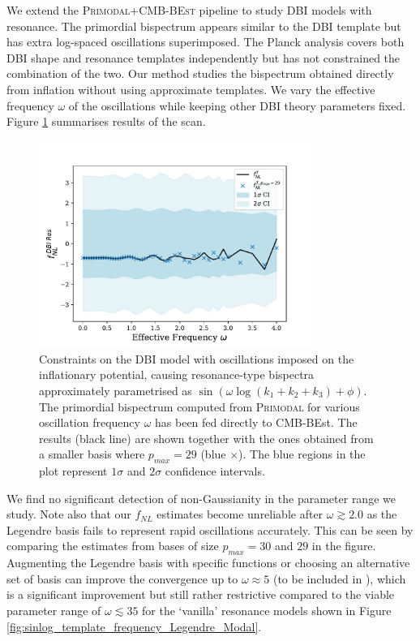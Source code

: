 \bigskip

We extend the \textsc{Primodal}+\textsc{CMB-BEst} pipeline to study DBI models with resonance. The primordial bispectrum appears similar to the DBI template but has extra log-spaced oscillations superimposed. The Planck analysis covers both DBI shape and resonance templates independently but has not constrained the combination of the two. Our method studies the bispectrum obtained directly from inflation without using approximate templates. We vary the effective frequency $\omega$ of the oscillations while keeping other DBI theory parameters fixed. Figure \ref{fig:dbi_resonance_scan} summarises results of the scan.

\begin{figure}[htbp!] 
	\centering    
	\includegraphics[width=0.8\textwidth]{dbi_reso_scan_fNLs_new.pdf}
	\caption{Constraints on the DBI model with oscillations imposed on the inflationary potential, causing resonance-type bispectra approximately parametrised as $\sin(\omega \log(k_1+k_2+k_3) + \phi)$. The primordial bispectrum computed from \textsc{Primodal} for various oscillation frequency $\omega$ has been fed directly to CMB-BEst. The results (black line) are shown together with the ones obtained from a smaller basis where $p_{max}=29$ (blue $\times$). The blue regions in the plot represent $1\sigma$ and $2\sigma$ confidence intervals.}
	\label{fig:dbi_resonance_scan}
\end{figure}

We find no significant detection of non-Gaussianity in the parameter range we study. Note also that our $f_{NL}$ estimates become unreliable after $\omega\gtrsim2.0$ as the Legendre basis fails to represent rapid oscillations accurately. This can be seen by comparing the estimates from bases of size $p_{max}=30$ and $29$ in the figure. Augmenting the Legendre basis with specific functions or choosing an alternative set of basis \cite{Clarke2021} can improve the convergence up to $\omega\approx5$ (to be included in \cite{Sohn2021inprep}), which is a significant improvement but still rather restrictive compared to the viable parameter range of $\omega\lesssim 35$ for the `vanilla' resonance models shown in Figure \ref{fig:sinlog_template_frequency_Legendre_Modal}.


